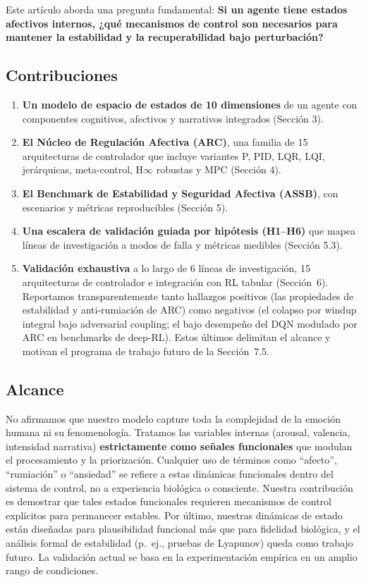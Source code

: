 \documentclass{article}
\begin{document}
Este artículo aborda una pregunta fundamental: \textbf{Si un agente tiene estados afectivos internos, ¿qué mecanismos de control son necesarios para mantener la estabilidad y la recuperabilidad bajo perturbación?}

\subsection{Contribuciones}

\begin{enumerate}
    \item \textbf{Un modelo de espacio de estados de 10 dimensiones} de un agente con componentes cognitivos, afectivos y narrativos integrados (Sección 3).
    \item \textbf{El Núcleo de Regulación Afectiva (ARC)}, una familia de 15 arquitecturas de controlador que incluye variantes P, PID, LQR, LQI, jerárquicas, meta-control, H$\infty$ robustas y MPC (Sección 4).
    \item \textbf{El Benchmark de Estabilidad y Seguridad Afectiva (ASSB)}, con escenarios y métricas reproducibles (Sección 5).
    \item \textbf{Una escalera de validación guiada por hipótesis (H1--H6)} que mapea líneas de investigación a modos de falla y métricas medibles (Sección 5.3).
    \item \textbf{Validación exhaustiva} a lo largo de 6 líneas de investigación, 15 arquitecturas de controlador e integración con RL tabular (Sección~6). Reportamos transparentemente tanto hallazgos positivos (las propiedades de estabilidad y anti-rumiación de ARC) como negativos (el colapso por windup integral bajo adversarial coupling; el bajo desempeño del DQN modulado por ARC en benchmarks de deep-RL). Estos últimos delimitan el alcance y motivan el programa de trabajo futuro de la Sección~7.5.
\end{enumerate}

\subsection{Alcance}

No afirmamos que nuestro modelo capture toda la complejidad de la emoción humana ni su fenomenología. Tratamos las variables internas (arousal, valencia, intensidad narrativa) \textbf{estrictamente como señales funcionales} que modulan el procesamiento y la priorización. Cualquier uso de términos como ``afecto'', ``rumiación'' o ``ansiedad'' se refiere a estas dinámicas funcionales dentro del sistema de control, no a experiencia biológica o consciente. Nuestra contribución es demostrar que tales estados funcionales requieren mecanismos de control explícitos para permanecer estables. Por último, nuestras dinámicas de estado están diseñadas para plausibilidad funcional más que para fidelidad biológica, y el análisis formal de estabilidad (p.\ ej., pruebas de Lyapunov) queda como trabajo futuro. La validación actual se basa en la experimentación empírica en un amplio rango de condiciones.
\end{document}
